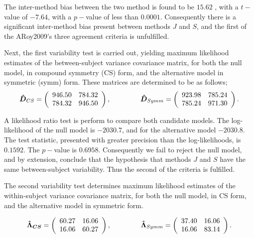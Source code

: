 \documentclass[12pt, a4paper]{report}
\theoremstyle{plain}
\theoremstyle{definition}
\theoremstyle{remark}
\begin{document}
	The inter-method bias between the two method is found to be $15.62$ , with a $t-$value of $-7.64$, with a $p-$value of less than $0.0001$. Consequently there is a significant inter-method bias present between methods $J$ and $S$, and the first of the ARoy2009's three agreement criteria is unfulfilled.
	
	Next, the first variability test is carried out, yielding maximum likelihood estimates of the between-subject variance covariance matrix, for both the null model, in compound symmetry (CS) form, and the alternative model in symmetric (symm) form. These matrices are determined to be as follows;
	\[
	\boldsymbol{\hat{D}}_{CS} = \left( \begin{array}{cc}
	946.50 & 784.32  \\
	784.32 & 946.50  \\
	\end{array}\right),
	\hspace{1.5cm}
	\boldsymbol{\hat{D}}_{Symm} = \left( \begin{array}{cc}
	923.98 & 785.24  \\
	785.24 & 971.30  \\
	\end{array}\right).
	\]
	
	A likelihood ratio test is perform to compare both candidate models. The log-likelihood of the null model is $-2030.7$, and for the alternative model $-2030.8$. The test statistic, presented with greater precision than the log-likelihoods, is $0.1592$. The $p-$value is $0.6958$. Consequently we fail to reject the null model, and by extension, conclude that the hypothesis that methods $J$ and $S$ have the same between-subject variability. Thus the second of the criteria is fulfilled.
	
	The second variability test determines maximum likelihood estimates of the within-subject variance covariance matrix, for both the null model, in CS form, and the alternative model in symmetric form.
	
	\[
	\boldsymbol{\hat{\Lambda}_{CS}} = \left( \begin{array}{cc}
	60.27  & 16.06  \\
	16.06  & 60.27  \\
	\end{array}\right),
	\hspace{1.5cm}
	\boldsymbol{\hat{\Lambda}}_{Symm} = \left( \begin{array}{cc}
	37.40 & 16.06  \\
	16.06 & 83.14  \\
	\end{array}\right).
	\]
	
\end{document}

